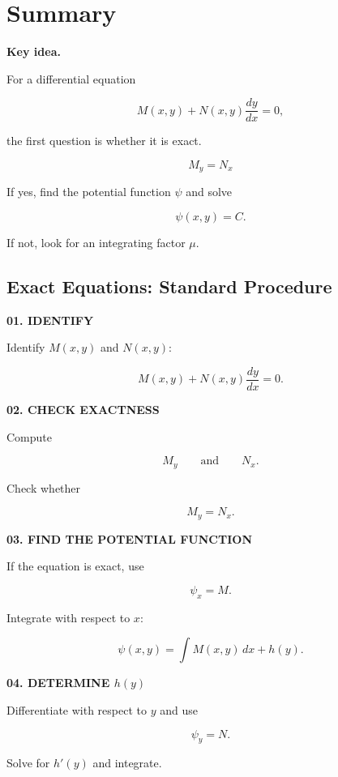 \documentclass[11pt]{article}
\newenvironment{keyideabox}
    {\par\medskip\noindent\textbf{Key idea.}\par}
    {\par\medskip}
\begin{document}
\section{Summary}

\begin{keyideabox}

For a differential equation

\[
M(x,y)+N(x,y)\frac{dy}{dx}=0,
\]

the first question is whether it is exact.

\[
\boxed{M_y=N_x}
\]

If yes, find the potential function $\psi$ and solve

\[
\boxed{\psi(x,y)=C}.
\]

If not, look for an integrating factor $\mu$.

\end{keyideabox}

\subsection{Exact Equations: Standard Procedure}

\textbf{01. IDENTIFY}

Identify $M(x,y)$ and $N(x,y)$:

\[
M(x,y)+N(x,y)\frac{dy}{dx}=0.
\]

\textbf{02. CHECK EXACTNESS}

Compute

\[
M_y
\qquad\text{and}\qquad
N_x.
\]

Check whether

\[
\boxed{M_y=N_x}.
\]

\textbf{03. FIND THE POTENTIAL FUNCTION}

If the equation is exact, use

\[
\psi_x=M.
\]

Integrate with respect to $x$:

\[
\psi(x,y)
=
\int M(x,y)\,dx+h(y).
\]

\textbf{04. DETERMINE $h(y)$}

Differentiate with respect to $y$ and use

\[
\psi_y=N.
\]

Solve for $h'(y)$ and integrate.
\end{document}
